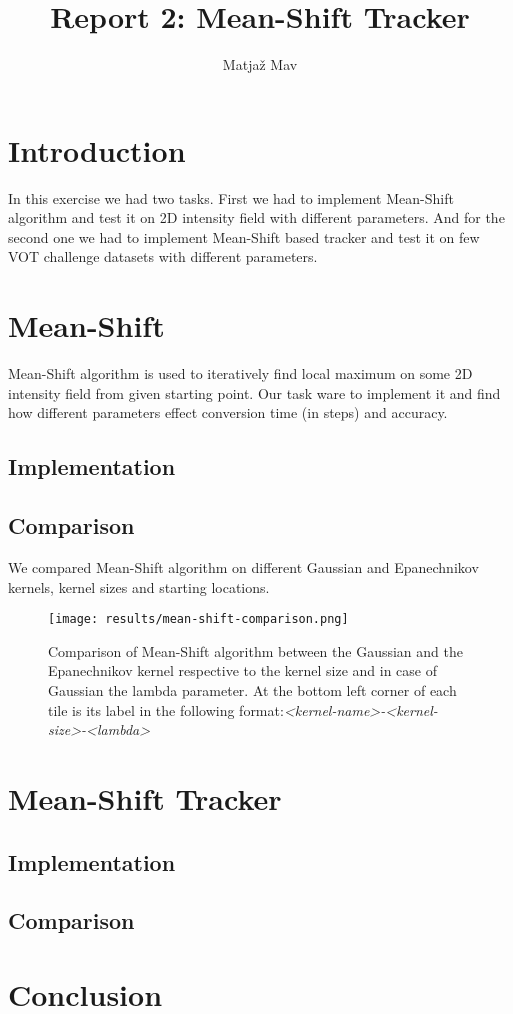 \documentclass[runningheads]{llncs}
\begin{document}
% 
\title{Report 2: Mean-Shift Tracker}
\author{Matjaž Mav}
%
\maketitle              %
% 

\section{Introduction}
In this exercise we had two tasks. First we had to implement Mean-Shift algorithm and test it on 2D intensity field with different parameters. And for the second one we had to implement Mean-Shift based tracker and test it on few VOT challenge datasets with different parameters.

\section{Mean-Shift}
Mean-Shift algorithm is used to iteratively find local maximum on some 2D intensity field from given starting point. Our task ware to implement it and find how different parameters effect conversion time (in steps) and accuracy.

\subsection{Implementation}
\subsection{Comparison}
We compared Mean-Shift algorithm on different Gaussian and Epanechnikov kernels, kernel sizes and starting locations.

\begin{figure}
    \centering
    \texttt{[image: results/mean-shift-comparison.png]}
    \caption{Comparison of Mean-Shift algorithm between the Gaussian and the Epanechnikov kernel respective to the kernel size and in case of Gaussian the lambda parameter. At the bottom left corner of each tile is its label in the following format:\newline \textit{\textless kernel-name\textgreater-\textless kernel-size\textgreater-\textless lambda\textgreater}}
    \label{img_meanshift}
\end{figure}

\section{Mean-Shift Tracker}
\subsection{Implementation}
\subsection{Comparison}

\section{Conclusion}
\end{document}
